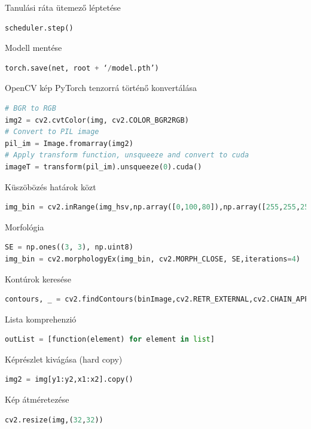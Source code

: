 \documentclass[12pt,a4paper,oneside]{report}             %
\begin{document}
Tanulási ráta ütemező léptetése

\begin{lstlisting}[language=Python]
scheduler.step()
\end{lstlisting}

Modell mentése

\begin{lstlisting}[language=Python]
torch.save(net, root + ‘/model.pth’)
\end{lstlisting}

OpenCV kép PyTorch tenzorrá történő konvertálása

\begin{lstlisting}[language=Python]
# BGR to RGB
img2 = cv2.cvtColor(img, cv2.COLOR_BGR2RGB)
# Convert to PIL image
pil_im = Image.fromarray(img2)
# Apply transform function, unsqueeze and convert to cuda
imageT = transform(pil_im).unsqueeze(0).cuda()
\end{lstlisting}

Küszöbözés határok közt

\begin{lstlisting}[language=Python]
img_bin = cv2.inRange(img_hsv,np.array([0,100,80]),np.array([255,255,255]))
\end{lstlisting}

Morfológia

\begin{lstlisting}[language=Python]
SE = np.ones((3, 3), np.uint8)
img_bin = cv2.morphologyEx(img_bin, cv2.MORPH_CLOSE, SE,iterations=4)
\end{lstlisting}

Kontúrok keresése

\begin{lstlisting}[language=Python]
contours, _ = cv2.findContours(binImage,cv2.RETR_EXTERNAL,cv2.CHAIN_APPROX_SIMPLE)
\end{lstlisting}

Lista komprehenzió

\begin{lstlisting}[language=Python]
outList = [function(element) for element in list]
\end{lstlisting}

Képrészlet kivágása (hard copy)

\begin{lstlisting}[language=Python]
img2 = img[y1:y2,x1:x2].copy()
\end{lstlisting}

Kép átméretezése

\begin{lstlisting}[language=Python]
cv2.resize(img,(32,32))
\end{lstlisting}
\end{document}
